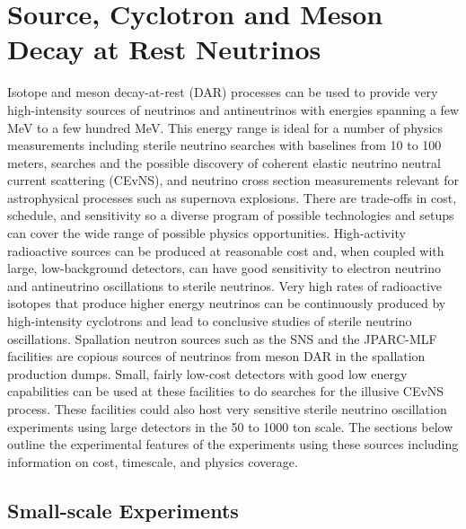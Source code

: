 \section{Source, Cyclotron and Meson Decay at Rest Neutrinos}
\label{sec:SourceCyclotronDAR}

Isotope and meson decay-at-rest (DAR) processes can be used to provide
very high-intensity sources of neutrinos and antineutrinos with
energies spanning a few MeV to a few hundred MeV.  This energy range
is ideal for a number of physics measurements including sterile
neutrino searches with baselines from 10 to 100 meters, searches and
the possible discovery of coherent elastic neutrino neutral current
scattering (CEvNS), and neutrino cross section measurements relevant
for astrophysical processes such as supernova explosions.  There are
trade-offs in cost, schedule, and sensitivity so a diverse program of
possible technologies and setups can cover the wide range of possible
physics opportunities.  High-activity radioactive sources can be
produced at reasonable cost and, when coupled with large,
low-background detectors, can have good sensitivity to electron
neutrino and antineutrino oscillations to sterile neutrinos. Very high
rates of radioactive isotopes that produce higher energy neutrinos can
be continuously produced by high-intensity cyclotrons and lead to
conclusive studies of sterile neutrino oscillations.  Spallation
neutron sources such as the SNS and the JPARC-MLF facilities are
copious sources of neutrinos from meson DAR in the spallation
production dumps.  Small, fairly low-cost detectors with good low
energy capabilities can be used at these facilities to do searches for
the illusive CEvNS process.  These facilities could also host very
sensitive sterile neutrino oscillation experiments using large
detectors in the 50 to 1000 ton scale.  The sections below outline the
experimental features of the experiments using these sources including
information on cost, timescale, and physics coverage.

\subsection{Small-scale Experiments}


